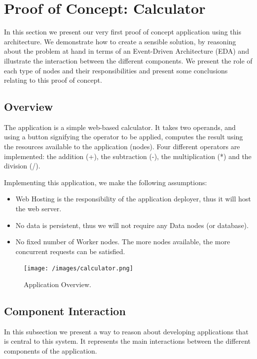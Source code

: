\documentclass[12pt, titlepage]{uo_temp}
\begin{document}
     \section{Proof of Concept: Calculator}
     In this section we present our very first proof of concept application using this
     architecture. We demonstrate how to create a sensible solution, by reasoning about
     the problem at hand in terms of an Event-Driven Architecture (EDA) and illustrate the
     interaction between the different components. We present the role of each type of
     nodes and their responsibilities and present some conclusions relating to this proof
     of concept.
     
     \subsection{Overview}
     The application is a simple web-based calculator. It takes two operands, and
     using a button signifying the operator to be applied, computes the result using the
     resources available to the application (nodes). Four different operators are
     implemented: the addition (+), the subtraction (-), the multiplication (*) and the
     division (/).  

     Implementing this application, we make the following assumptions:
     \begin{itemize}
       \item Web Hosting is the responsibility of the application deployer, thus it will
         host the web server.
       \item No data is persistent, thus we will not require any Data nodes (or database).
       \item No fixed number of Worker nodes. The more nodes available, the more
         concurrent requests can be satisfied.
     \end{itemize}
     
     \begin{figure}
       \texttt{[image: /images/calculator.png]}
       \caption{Application Overview.}
     \end{figure}
     

     \subsection{Component Interaction}
     In this subsection we present a way to reason about developing applications that is
     central to this system. It represents the main interactions between the different
     components of the application.
 
\end{document}
